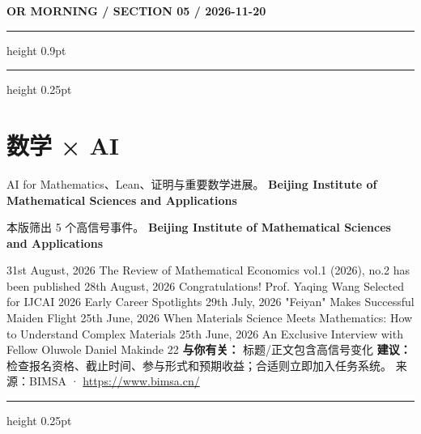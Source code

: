 \documentclass[10.5pt]{ctexart}
\begin{document}
\newpage
{\small\bfseries OR MORNING / SECTION 05 / 2026-11-20}
\vspace{2mm}
\hrule height 0.9pt
\vspace{1.5mm}
\hrule height 0.25pt
\vspace{4mm}
\section*{数学 × AI}
{\color{ormuted} AI for Mathematics、Lean、证明与重要数学进展。}
\vspace{2mm}
{\LARGE\bfseries Beijing Institute of Mathematical Sciences and Applications}\par
\vspace{1mm}
{\color{ormuted} 本版筛出 5 个高信号事件。}
\vspace{3mm}
{\Large\bfseries Beijing Institute of Mathematical Sciences and Applications}\par
31st August, 2026 The Review of Mathematical Economics vol.1 (2026), no.2 has been published 28th August, 2026 Congratulations! Prof. Yaqing Wang Selected for IJCAI 2026 Early Career Spotlights 29th July, 2026 "Feiyan" Makes Successful Maiden Flight 25th June, 2026 When Materials Science Meets Mathematics: How to Understand Complex Materials 25th June, 2026 An Exclusive Interview with Fellow Oluwole Daniel Makinde 22
\textbf{与你有关：} 标题/正文包含高信号变化
\textbf{建议：} 检查报名资格、截止时间、参与形式和预期收益；合适则立即加入任务系统。
{\footnotesize\color{ormuted} 来源：BIMSA · \url{https://www.bimsa.cn/}}
\vspace{4mm}
\hrule height 0.25pt
\vspace{3mm}
\end{document}
